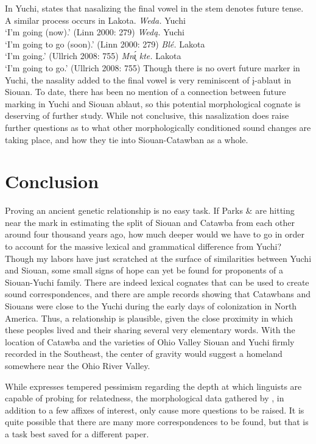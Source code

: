 \documentclass[output=paper]{LSP/langsci}
\begin{document}
In Yuchi, \citet{Linn2000} states that nasalizing the final vowel in the stem denotes future tense. A similar process occurs in Lakota.
\ea
	\ea \textit{Weda.} \hfill Yuchi\\
		`I'm going (now).' (Linn 2000: 279)
	\ex \textit{Wed\k{a}.} \hfill Yuchi\\
		`I'm going to go (soon).' (Linn 2000: 279)
	\ex \textit{Bl\'e.} \hfill Lakota\\
		`I'm going.' (Ullrich 2008: 755)
	\ex \textit{Mn\k{\'\i} kte.} \hfill Lakota\\
		`I'm going to go.' (Ullrich 2008: 755)
	\z
\z
Though there is no overt future marker in Yuchi, the nasality added to the final vowel is very reminiscent of \k{i}-ablaut in Siouan. To date, there has been no mention of a connection between future marking in Yuchi and Siouan ablaut, so this potential morphological cognate is deserving of further study. While not conclusive, this nasalization does raise further questions as to what other morphologically conditioned sound changes are taking place, and how they tie into Siouan-Catawban as a whole.

\section{Conclusion}

Proving an ancient genetic relationship is no easy task. If Parks \& \citet{Rankin2001} are hitting near the mark in estimating the split of Siouan and Catawba from each other around four thousand years ago, how much deeper would we have to go in order to account for the massive lexical and grammatical difference from Yuchi? Though my labors have just scratched at the surface of similarities between Yuchi and Siouan, some small signs of hope can yet be found for proponents of a Siouan-Yuchi family. There are indeed lexical cognates that can be used to create sound correspondences, and there are ample records showing that Catawbans and Siouans were close to the Yuchi during the early days of colonization in North America. Thus, a relationship is plausible, given the close proximity in which these peoples lived and their sharing several very elementary words. With the location of Catawba and the varieties of Ohio Valley Siouan and Yuchi firmly recorded in the Southeast, the center of gravity would suggest a homeland somewhere near the Ohio River Valley.

While \citet{Rankin1996} expresses tempered pessimism regarding the depth at which linguists are capable of probing for relatedness, the morphological data gathered by \citet{Rankin1998}, in addition to a few affixes of interest, only cause more questions to be raised. It is quite possible that there are many more correspondences to be found, but that is a task best saved for a different paper.
\end{document}
